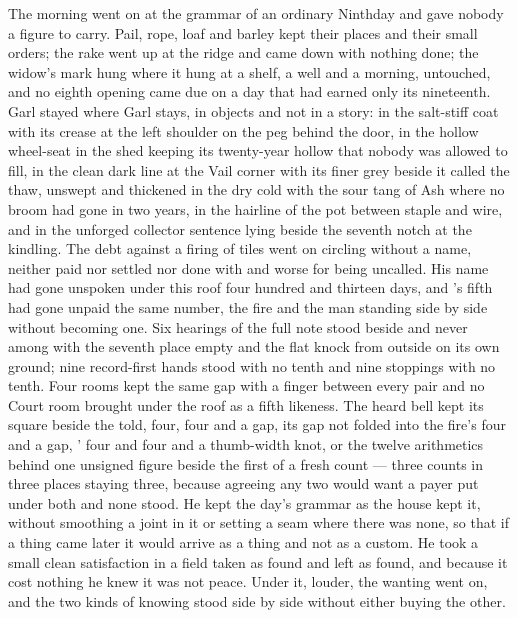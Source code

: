 The morning went on at the grammar of an ordinary Ninthday and gave nobody a figure to carry. Pail, rope, loaf and barley kept their places and their small orders; the rake went up at the ridge and came down with nothing done; the widow's mark hung where it hung at a shelf, a well and a morning, untouched, and no eighth opening came due on a day that had earned only its nineteenth. Garl stayed where Garl stays, in objects and not in a story: in the salt-stiff coat with its crease at the left shoulder on the peg behind the door, in the hollow wheel-seat in the shed keeping its twenty-year hollow that nobody was allowed to fill, in the clean dark line at the Vail corner with its finer grey beside it called the thaw, unswept and thickened in the dry cold with the sour tang of Ash where no broom had gone in two years, in the hairline of the pot between staple and wire, and in the unforged collector sentence lying beside the seventh notch at the kindling. The debt against a firing of tiles went on circling without a name, neither paid nor settled nor done with and worse for being uncalled. His name had gone unspoken under this roof four hundred and thirteen days, and 's fifth had gone unpaid the same number, the fire and the man standing side by side without becoming one. Six hearings of the full note stood beside and never among with the seventh place empty and the flat knock from  outside on its own ground; nine record-first hands stood with no tenth and nine stoppings with no tenth. Four rooms kept the same gap with a finger between every pair and no Court room brought under the roof as a fifth likeness. The heard bell kept its square beside the told, four, four and a gap, its gap not folded into the fire's four and a gap, ' four and four and a thumb-width knot, or the twelve arithmetics behind one unsigned figure beside the first of a fresh count --- three counts in three places staying three, because agreeing any two would want a payer put under both and none stood. He kept the day's grammar as the house kept it, without smoothing a joint in it or setting a seam where there was none, so that if a thing came later it would arrive as a thing and not as a custom. He took a small clean satisfaction in a field taken as found and left as found, and because it cost nothing he knew it was not peace. Under it, louder, the wanting went on, and the two kinds of knowing stood side by side without either buying the other.

